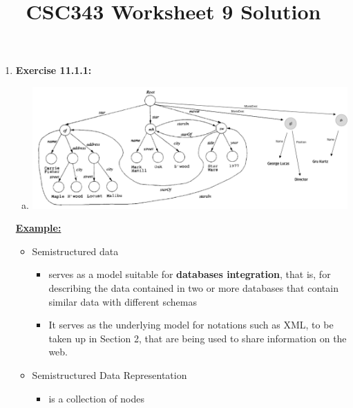 \documentclass[12pt]{article}
\begin{document}
\title{CSC343 Worksheet 9 Solution}
\maketitle

\bigskip

\begin{enumerate}[1.]
    \item \textbf{Exercise 11.1.1:}

    \bigskip

    \begin{enumerate}[a)]
        \item

    \begin{center}
    \includegraphics[width=\linewidth]{images/worksheet_9_solution_4.png}
    \end{center}

    \end{enumerate}

    \underline{\textbf{Example:}}

    \begin{itemize}
        \item Semistructured data
        \begin{itemize}
            \item serves as a model suitable for \textbf{databases integration}, that is,
            for describing the data contained in two or more databases that contain similar data with
            different schemas

            \item It serves as the underlying model for notations such as XML, to be taken
            up in Section 2, that are being used to share information on the web.
        \end{itemize}

        \item Semistructured Data Representation
        \begin{itemize}
            \item is a collection of nodes


\end{itemize}
\end{itemize}
\end{enumerate}
\end{document}
